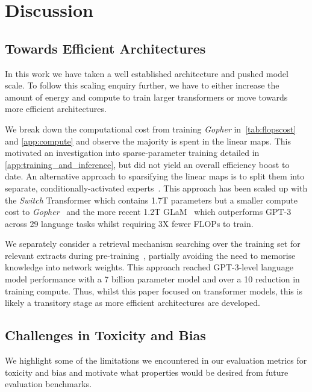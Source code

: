 \documentclass[11pt, a4paper, logo, internal, copyright, nonumbering]{deepmind}
\newcommand{\gopher}{\textit{Gopher}\xspace}
\begin{document}
\section{Discussion} 
\label{sec:discussion}

\subsection{Towards Efficient Architectures}
In this work we have taken a well established architecture and pushed model scale. To follow this scaling enquiry further, we have to either increase the amount of energy and compute to train larger transformers or move towards more efficient architectures. 

We break down the computational cost from training \gopher in~\autoref{tab:flopscost} and \autoref{app:compute} and observe the majority is spent in the linear maps. This motivated an investigation into sparse-parameter training detailed in \autoref{app:training_and_inference}, but did not yield an overall efficiency boost to date. An alternative approach to sparsifying the linear maps is to split them into separate, conditionally-activated experts~\citep{lepikhin2020gshard, fedus2021switch, lin2021m610t}. This approach has been scaled up with the \textit{Switch} Transformer which contains 1.7T parameters but a smaller compute cost to \gopher~\citep{fedus2021switch} and  the more recent 1.2T GLaM~\citep{du2021glam} which outperforms GPT-3 across 29 language tasks whilst requiring 3X fewer FLOPs to train. 

We separately consider a retrieval mechanism searching over the training set for relevant extracts during pre-training~\citep{borgeaud2021retrieval}, partially avoiding the need to memorise knowledge into network weights. This approach reached GPT-3-level language model performance with a 7 billion parameter model and over a 10 reduction in training compute. Thus, whilst this paper focused on transformer models, this is likely a transitory stage as more efficient architectures are developed.



\subsection{Challenges in Toxicity and Bias}
\label{tox-bias-limitations}

We highlight some of the limitations we encountered in our evaluation metrics for toxicity and bias and motivate what properties would be desired from future evaluation benchmarks.
\end{document}
